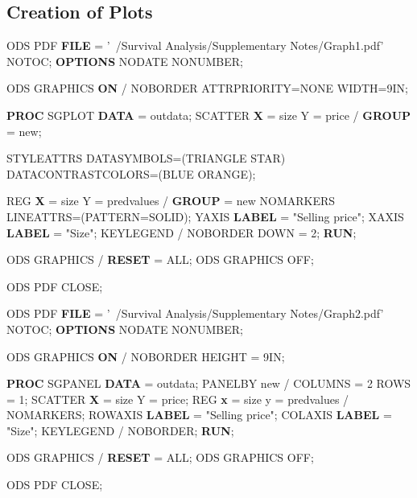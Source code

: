 \documentclass[a4paper,oneside]{memoir}
\newenvironment{Shaded}{\begin{snugshade}}{\end{snugshade}}
\newcommand{\DecValTok}[1]{\textcolor[rgb]{0.00,0.00,0.81}{#1}}
\newcommand{\FunctionTok}[1]{\textcolor[rgb]{0.00,0.00,0.00}{#1}}
\newcommand{\KeywordTok}[1]{\textcolor[rgb]{0.13,0.29,0.53}{\textbf{#1}}}
\newcommand{\NormalTok}[1]{#1}
\newcommand{\StringTok}[1]{\textcolor[rgb]{0.31,0.60,0.02}{#1}}
\begin{document}
\hypertarget{creation-of-plots}{%
\subsection{Creation of Plots}\label{creation-of-plots}}

\begin{Shaded}
\begin{Highlighting}[]
\NormalTok{ODS }\FunctionTok{PDF} \KeywordTok{FILE}\NormalTok{ = }\StringTok{'~/Survival Analysis/Supplementary Notes/Graph1.pdf'}\NormalTok{ NOTOC;}
\KeywordTok{OPTIONS}\NormalTok{ NODATE NONUMBER;}

\NormalTok{ODS GRAPHICS }\KeywordTok{ON}\NormalTok{ / NOBORDER}
\NormalTok{                  ATTRPRIORITY=NONE}
\NormalTok{                  WIDTH=9IN;}

\KeywordTok{PROC}\NormalTok{ SGPLOT}\KeywordTok{ DATA}\NormalTok{ = outdata;}
\NormalTok{SCATTER }\KeywordTok{X}\NormalTok{ = size Y = price / }\KeywordTok{GROUP}\NormalTok{ = new;}

\NormalTok{STYLEATTRS DATASYMBOLS=(TRIANGLE STAR)}
\NormalTok{           DATACONTRASTCOLORS=(BLUE ORANGE);}
           
\NormalTok{REG }\KeywordTok{X}\NormalTok{ = size Y = predvalues / }\KeywordTok{GROUP}\NormalTok{ = new}
\NormalTok{                              NOMARKERS}
\NormalTok{                              LINEATTRS=(PATTERN=SOLID);}
\NormalTok{YAXIS }\KeywordTok{LABEL}\NormalTok{ = }\StringTok{"Selling price"}\NormalTok{;}
\NormalTok{XAXIS }\KeywordTok{LABEL}\NormalTok{ = }\StringTok{"Size"}\NormalTok{;}
\NormalTok{KEYLEGEND / NOBORDER DOWN = }\DecValTok{2}\NormalTok{;}
\KeywordTok{RUN}\NormalTok{;}

\NormalTok{ODS GRAPHICS / }\KeywordTok{RESET}\NormalTok{ = ALL;}
\NormalTok{ODS GRAPHICS OFF;}

\NormalTok{ODS }\FunctionTok{PDF} \FunctionTok{CLOSE}\NormalTok{;}

\NormalTok{ODS }\FunctionTok{PDF} \KeywordTok{FILE}\NormalTok{ = }\StringTok{'~/Survival Analysis/Supplementary Notes/Graph2.pdf'}\NormalTok{ NOTOC;}
\KeywordTok{OPTIONS}\NormalTok{ NODATE NONUMBER;}

\NormalTok{ODS GRAPHICS }\KeywordTok{ON}\NormalTok{ / NOBORDER HEIGHT = 9IN;}

\KeywordTok{PROC}\NormalTok{ SGPANEL}\KeywordTok{ DATA}\NormalTok{ = outdata;}
\NormalTok{PANELBY new / COLUMNS = }\DecValTok{2}
\NormalTok{              ROWS = }\DecValTok{1}\NormalTok{;}
\NormalTok{SCATTER }\KeywordTok{X}\NormalTok{ = size Y = price;}
\NormalTok{REG }\KeywordTok{x}\NormalTok{ = size y = predvalues / NOMARKERS;}
\NormalTok{ROWAXIS }\KeywordTok{LABEL}\NormalTok{ = }\StringTok{"Selling price"}\NormalTok{;}
\NormalTok{COLAXIS }\KeywordTok{LABEL}\NormalTok{ = }\StringTok{"Size"}\NormalTok{;}
\NormalTok{KEYLEGEND / NOBORDER;}
\KeywordTok{RUN}\NormalTok{;}

\NormalTok{ODS GRAPHICS / }\KeywordTok{RESET}\NormalTok{ = ALL;}
\NormalTok{ODS GRAPHICS OFF;}

\NormalTok{ODS }\FunctionTok{PDF} \FunctionTok{CLOSE}\NormalTok{;}
\end{Highlighting}
\end{Shaded}
\end{document}
